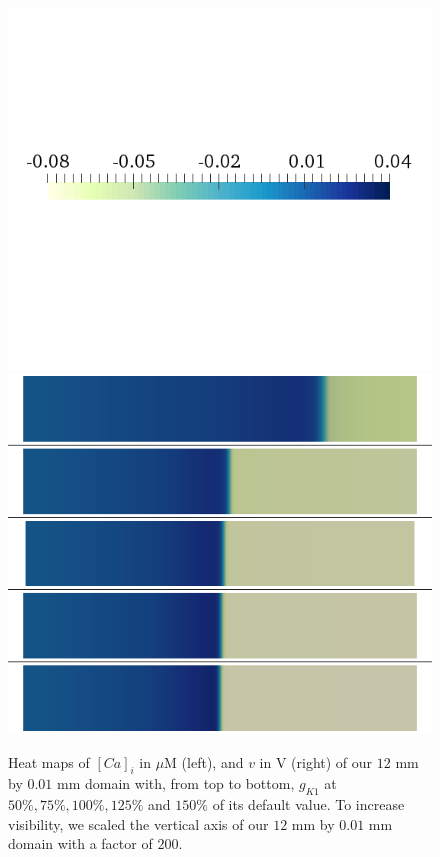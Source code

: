 \documentclass{article}
\begin{document}
\begin{figure}
\begin{minipage}{0.5\textwidth}
\includegraphics[trim=0cm 7cm 0cm 6cm, clip=true, width=1\linewidth]{legend_v2}
\includegraphics[trim=0cm 0cm 0cm 0cm, clip=true, width=1\linewidth]{v_gk1}
    \end{minipage}
    \caption{Heat maps of $[Ca]_i$ in $\mu$M (left), and $v$ in V (right) of our $12$ mm by $0.01$ mm domain with, from top to bottom, $g_{K1}$ at $50\%, 75\%, 100\%, 125\%$ and $150\%$ of its default value. To increase visibility, we scaled the vertical axis of our $12$ mm by $0.01$ mm domain with a factor of $200$.}
    \label{fig:1d}
\end{figure}
\end{document}
